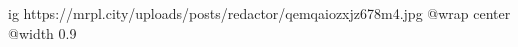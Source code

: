 
 
 
 
 

\ifcmt
  ig https://mrpl.city/uploads/posts/redactor/qemqaiozxjz678m4.jpg
  @wrap center
  @width 0.9
\fi
